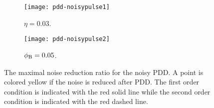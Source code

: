 \documentclass[b5paper,11pt]{article}
\begin{document}
 \begin{figure}
 \centering
 \begin{subfigure}{0.45\linewidth}
\texttt{[image: pdd-noisypulse1]}
\caption{$\eta =0.03$.}
\label{fig:pdd-noisy-pulse1}
\end{subfigure}
\hfill
\begin{subfigure}{0.45\linewidth}
\texttt{[image: pdd-noisypulse2]}
\caption{$\phi_{\mathrm{B}} =0.05$.}
\label{fig:pdd-noisy-pulse2}
\end{subfigure}
\caption{The maximal noise reduction ratio for the noisy PDD. A point is colored yellow if the noise is reduced after PDD.  The first order condition is indicated with the red solid line while the second order condition is indicated with the red dashed line. }
\label{fig:pdd-noisy-pulse}
\end{figure}
\end{document}
